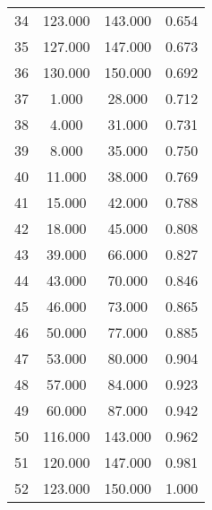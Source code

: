 \begin{tabular}{cccc}
  34 & 123.000 & 143.000 & 0.654 \\ 
  35 & 127.000 & 147.000 & 0.673 \\ 
  36 & 130.000 & 150.000 & 0.692 \\ 
  37 & 1.000 & 28.000 & 0.712 \\ 
  38 & 4.000 & 31.000 & 0.731 \\ 
  39 & 8.000 & 35.000 & 0.750 \\ 
  40 & 11.000 & 38.000 & 0.769 \\ 
  41 & 15.000 & 42.000 & 0.788 \\ 
  42 & 18.000 & 45.000 & 0.808 \\ 
  43 & 39.000 & 66.000 & 0.827 \\ 
  44 & 43.000 & 70.000 & 0.846 \\ 
  45 & 46.000 & 73.000 & 0.865 \\ 
  46 & 50.000 & 77.000 & 0.885 \\ 
  47 & 53.000 & 80.000 & 0.904 \\ 
  48 & 57.000 & 84.000 & 0.923 \\ 
  49 & 60.000 & 87.000 & 0.942 \\ 
  50 & 116.000 & 143.000 & 0.962 \\ 
  51 & 120.000 & 147.000 & 0.981 \\ 
  52 & 123.000 & 150.000 & 1.000 \\ 
   \hline
\end{tabular}
